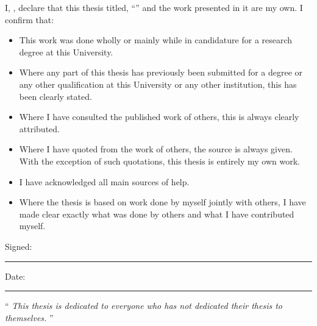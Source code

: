 \documentclass[
11pt, %
english, %
singlespacing, %
headsepline, %
]{Control/UL_control/UL_utils/MasterDoctoralThesis} %
\begin{document}
\begin{declaration}
\addchaptertocentry{\authorshipname} %
\noindent I, \authorname, declare that this thesis titled, \enquote{\ttitle} and the work presented in it are my own. I confirm that:

\begin{itemize} 
\item This work was done wholly or mainly while in candidature for a research degree at this University.
\item Where any part of this thesis has previously been submitted for a degree or any other qualification at this University or any other institution, this has been clearly stated.
\item Where I have consulted the published work of others, this is always clearly attributed.
\item Where I have quoted from the work of others, the source is always given. With the exception of such quotations, this thesis is entirely my own work.
\item I have acknowledged all main sources of help.
\item Where the thesis is based on work done by myself jointly with others, I have made clear exactly what was done by others and what I have contributed myself.\\
\end{itemize}
 
\noindent Signed:\\
\rule[0.5em]{25em}{0.5pt} %
 
\noindent Date:\\
\rule[0.5em]{25em}{0.5pt} %
\end{declaration}

\cleardoublepage

\vspace*{0.2\textheight}

\noindent
\enquote{
\itshape 
\Large{This thesis is dedicated to everyone who has not dedicated their thesis to themselves.}
}
\newpage
\end{document}
